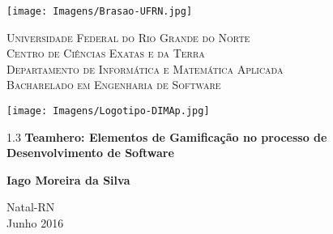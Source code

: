 
\begin{titlepage}
	\begin{center}

		\begin{minipage}{2cm}
			\begin{center}
				\texttt{[image: Imagens/Brasao-UFRN.jpg]}
			\end{center}
		\end{minipage}
		\begin{minipage}{11cm}
			\begin{center}
				\begin{espacosimples}
					{\small \textsc{Universidade Federal do Rio Grande do Norte}			\\
							  \textsc{Centro de Ciências Exatas e da Terra}						\\
							  \textsc{Departamento de Informática e Matemática Aplicada}	\\
							  \textsc{Bacharelado em Engenharia de Software}}
				\end{espacosimples}
			\end{center}
		\end{minipage}
		\begin{minipage}{2cm}
			\begin{center}
				\texttt{[image: Imagens/Logotipo-DIMAp.jpg]}
			\end{center}
		\end{minipage}

		\vspace{5cm}

		{\setlength{\baselineskip}%
		{1.3\baselineskip}
		{\LARGE \textbf{Teamhero: Elementos de Gamificação no processo de Desenvolvimento de Software}}\par}

		\vspace{4cm}

		{\large \textbf{Iago Moreira da Silva}}

		\vspace{7cm}

		Natal-RN\\Junho 2016
	\end{center}
\end{titlepage}
